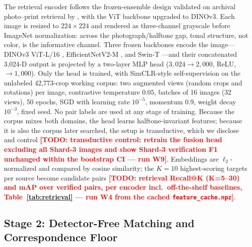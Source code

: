 \documentclass[letterpaper]{article} %
\newcommand{\todo}[1]{\textcolor{red}{\textbf{[TODO: #1]}}}
\begin{document}
The retrieval encoder follows the frozen-ensemble design validated on
archival photo--print retrieval by \citet{du2024probing}, with the ViT
backbone upgraded to DINOv3. Each image is resized to $224{\times}224$ and
rendered as three-channel grayscale before ImageNet normalization: across
the photograph/halftone gap, tonal structure, not color, is the informative
channel. Three frozen backbones encode the image---DINOv3 ViT-L/16
\citep[1{,}024-D;][]{simeoni2025dinov3}, EfficientNetV2-M
\citep[1{,}000-D;][]{tan2021efficientnetv2}, and Swin-T
\citep[1{,}000-D;][]{liu2021swin}---and their concatenated 3{,}024-D output
is projected by a two-layer MLP head ($3{,}024 \!\to\! 2{,}000$, ReLU,
$\to\! 1{,}000$). Only the head is trained, with SimCLR-style
self-supervision \citep{chen2020simclr} on the unlabeled 42{,}773-crop
working corpus: two augmented views (random crops and rotations) per image,
contrastive temperature $0.05$, batches of 16 images (32 views), 50 epochs,
SGD with learning rate $10^{-5}$, momentum $0.9$, weight decay $10^{-3}$,
fixed seed. No pair labels are used at any stage of training. Because the
corpus mixes both domains, the head learns halftone-invariant features;
because it is also the corpus later searched, the setup is transductive,
which we disclose and control \todo{transductive control: retrain the
fusion head excluding all Shard-3 images and show Shard-3 verification F1
unchanged within the bootstrap CI --- run W9}. Embeddings are
$\ell_2$-normalized and compared by cosine similarity; the $K{=}10$
highest-scoring targets per source become candidate pairs \todo{retrieval
Recall@K (K=5--30) and mAP over verified pairs, per encoder incl.\
off-the-shelf baselines, Table~\ref{tab:retrieval} --- run W4 from the cached
\texttt{feature\_cache.npz}}.

\subsection{Stage 2: Detector-Free Matching and Correspondence Floor}
\end{document}

